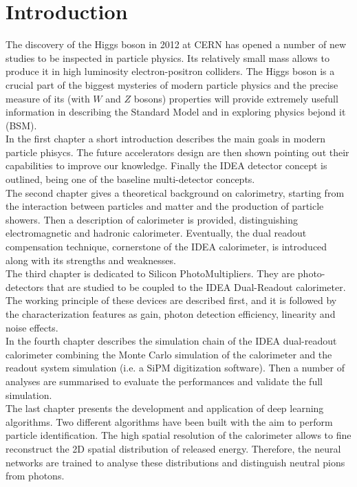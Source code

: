 \chapter{Introduction}
The discovery of the Higgs boson in 2012 at CERN has opened a number of new studies to be inspected in particle physics. Its relatively small mass allows to produce it in high luminosity electron-positron colliders.
The Higgs boson is a crucial part of the biggest mysteries of modern particle physics and the precise measure of its (with $W$ and $Z$ bosons) properties will provide extremely usefull information in describing the Standard Model and in exploring physics bejond it (BSM). 
\\

In the first chapter a short introduction describes the main goals in modern particle phisycs. The future accelerators design are then shown pointing out their capabilities to improve our knowledge.
Finally the IDEA detector concept is outlined, being one of the baseline multi-detector concepts.
\\

The second chapter gives a theoretical background on calorimetry, starting from the interaction between particles and matter and the production of particle showers. Then a description of calorimeter is provided, distinguishing electromagnetic and hadronic calorimeter. Eventually, the dual readout compensation technique, cornerstone of the IDEA calorimeter, is introduced along with its strengths and weaknesses.
\\

The third chapter is dedicated to Silicon PhotoMultipliers. They are photo-detectors that are studied to be coupled to the IDEA Dual-Readout calorimeter. The working principle of these devices are described first, and it is followed by the characterization features as gain, photon detection efficiency, linearity and noise effects.
\\

In the fourth chapter describes the simulation chain of the IDEA dual-readout calorimeter combining the Monte Carlo simulation of the calorimeter and the readout system simulation (i.e. a SiPM digitization software). Then a number of analyses are summarised to evaluate the performances and validate the full simulation.
\\

The last chapter presents the development and application of deep learning algorithms. Two different algorithms have been built with the aim to perform particle identification. The high spatial resolution of the calorimeter allows to fine reconstruct the 2D spatial distribution of released energy. Therefore, the neural networks are trained to analyse these distributions and distinguish neutral pions from photons.
\\